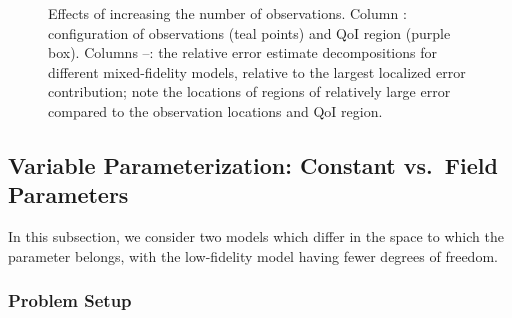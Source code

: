 \documentclass[review,sort&compress]{elsarticle}
\theoremstyle{plain} %
\theoremstyle{definition} %
\begin{document}
\begin{figure}[htbp]
{  \label{subfig:obsMFlast2}
}
  \caption{Effects of increasing the number of observations. Column \protect{}: configuration of observations (teal points) and QoI region (purple box). Columns \protect{}--\protect{}: the relative error estimate decompositions for different mixed-fidelity models, relative to the largest localized error contribution; note the locations of regions of relatively large error compared to the observation locations and QoI region.}
  \label{fig:dataStudy}
\end{figure}

\subsection{Variable Parameterization: Constant vs.\ Field Parameters} \label{sec:constvfield}

In this subsection, we consider two models which differ in the space to which the parameter belongs, with the low-fidelity model having fewer degrees of freedom. 

\subsubsection{Problem Setup}
\end{document}

